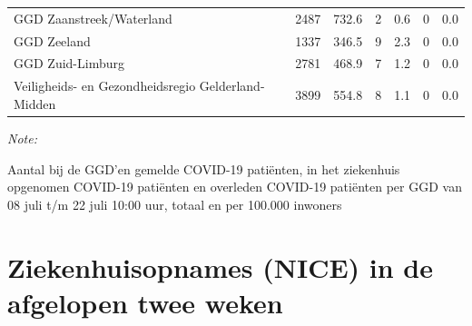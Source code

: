 \documentclass[
  english,
  man,floatsintext]{apa6}
\begin{document}
\begin{table}
\begin{threeparttable}
\begin{tabular}{lrrrrrr}
GGD Zaanstreek/Waterland & 2487 & 732.6 & 2 & 0.6 & 0 & 0.0\\
GGD Zeeland & 1337 & 346.5 & 9 & 2.3 & 0 & 0.0\\
GGD Zuid-Limburg & 2781 & 468.9 & 7 & 1.2 & 0 & 0.0\\
Veiligheids- en Gezondheidsregio Gelderland-Midden & 3899 & 554.8 & 8 & 1.1 & 0 & 0.0\\
\bottomrule
\end{tabular}
\begin{tablenotes}
\item \textit{Note: } 
\item Aantal bij de GGD’en gemelde COVID-19 patiënten, in het ziekenhuis opgenomen COVID-19 patiënten en overleden COVID-19 patiënten per GGD van 08 juli t/m 22 juli 10:00 uur, totaal en per 100.000 inwoners
\end{tablenotes}
\end{threeparttable}
\endgroup{}
\end{table}

\newpage

\hypertarget{ziekenhuisopnames-nice-in-de-afgelopen-twee-weken}{%
\section{Ziekenhuisopnames (NICE) in de afgelopen twee weken}\label{ziekenhuisopnames-nice-in-de-afgelopen-twee-weken}}
\end{document}
